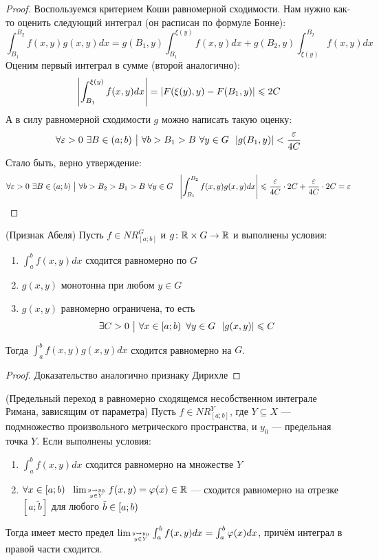 \begin{proof}
	Воспользуемся критерием Коши равномерной сходимости. Нам нужно как-то оценить следующий интеграл (он расписан по формуле Бонне):
	\[
		\int_{B_1}^{B_2} f(x, y)g(x, y)dx = g(B_1, y) \int_{B_1}^{\xi(y)} f(x, y)dx + g(B_2, y) \int_{\xi(y)}^{B_2} f(x, y)dx
	\]
	Оценим первый интеграл в сумме (второй аналогично):
	\[
		\md{\int_{B_1}^{\xi(y)} f(x, y)dx} = |F(\xi(y), y) - F(B_1, y)| \le 2C
	\]
	А в силу равномерной сходимости $g$ можно написать такую оценку:
	\[
		\forall \eps > 0\ \exists B \in (a; b) \such \forall b > B_1 > B\ \forall y \in G\ \ |g(B_1, y)| < \frac{\eps}{4C}
	\]
	Стало быть, верно утверждение:
	\[
		\forall \eps > 0\ \exists B \in (a; b) \such \forall b > B_2 > B_1 > B\ \forall y \in G\ \ \md{\int_{B_1}^{B_2} f(x, y)g(x, y)dx} \le \frac{\eps}{4C} \cdot 2C + \frac{\eps}{4C} \cdot 2C = \eps
	\]
\end{proof}

\begin{theorem} (Признак Абеля)
	Пусть $f \in NR_{[a; b]}^G$ и $g \colon \R \times G \to \R$ и выполнены условия:
	\begin{enumerate}
		\item $\int_a^b f(x, y)dx$ сходится равномерно по $G$
		
		\item $g(x, y)$ монотонна при любом $y \in G$
		
		\item $g(x, y)$ равномерно ограничена, то есть
		\[
			\exists C > 0 \such \forall x \in \lsi{a; b}\ \forall y \in G\ \ |g(x, y)| \le C
		\]
	\end{enumerate}
	Тогда $\int_a^b f(x, y)g(x, y)dx$ сходится равномерно на $G$.
\end{theorem}

\begin{proof}
	Доказательство аналогично признаку Дирихле
\end{proof}

\begin{theorem} (Предельный переход в равномерно сходящемся несобственном интеграле Римана, зависящим от параметра)
	Пусть $f \in NR_{[a; b]}^Y$, где $Y \subseteq X$ --- подмножество произвольного метрического пространства, и $y_0$ --- предельная точка $Y$. Если выполнены условия:
	\begin{enumerate}
		\item $\int_a^b f(x, y)dx$ сходится равномерно на множестве $Y$
		
		\item $\forall x \in \lsi{a; b}\ \ \lim_{y \to y_0 \atop {y \in Y}} f(x, y) = \phi(x) \in \R$ --- сходится равномерно на отрезке $[a; \tilde{b}]$ для любого $\tilde{b} \in \lsi{a; b}$
	\end{enumerate}
	Тогда имеет место предел $\lim_{y \to y_0 \atop {y \in Y}} \int_a^b f(x, y)dx = \int_a^b \phi(x)dx$, причём интеграл в правой части сходится.
\end{theorem}

